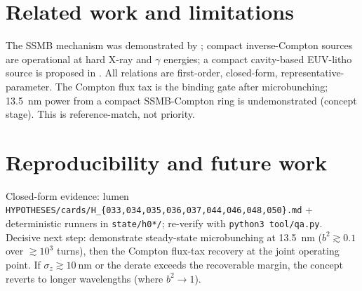 \documentclass[11pt,a4paper]{article}
\begin{document}
\section{Related work and limitations}
The SSMB mechanism was demonstrated by \citet{deng2021}; compact inverse-Compton sources are
operational at hard X-ray and $\gamma$ energies; a compact cavity-based EUV-litho source is proposed
in \citet{he2025}. All relations are first-order, closed-form, representative-parameter. The Compton
flux tax is the binding gate after microbunching; \SI{13.5}{\nano\meter} power from a compact
SSMB-Compton ring is undemonstrated (concept stage). This is reference-match, not priority.

\section{Reproducibility and future work}
Closed-form evidence: lumen \texttt{HYPOTHESES/cards/H\_\{033,034,035,036,037,044,046,048,050\}.md} +
deterministic runners in \texttt{state/h0*/}; re-verify with \texttt{python3 tool/qa.py}. Decisive
next step: demonstrate steady-state microbunching at \SI{13.5}{\nano\meter} ($b^2\gtrsim0.1$ over
$\gtrsim\!10^{3}$ turns), then the Compton flux-tax recovery at the joint operating point. If
$\sigma_z\gtrsim\!\SI{10}{\nano\meter}$ or the derate exceeds the recoverable margin, the concept
reverts to longer wavelengths (where $b^2\!\to\!1$).



\end{document}
